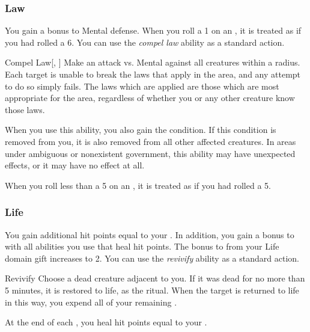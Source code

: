         \subsubsection{Law}
             You gain a  bonus to Mental defense.
             When you roll a 1 on an , it is treated as if you had rolled a 6.
             You can use the \textit{compel law} ability as a standard action.
            \begin{apability}{Compel Law}[, ]
                Make an attack vs. Mental against all creatures within a \arealarge radius.
                \hit Each target is unable to break the laws that apply in the area, and any attempt to do so simply fails.
                The laws which are applied are those which are most appropriate for the area, regardless of whether you or any other creature know those laws.

                When you use this ability, you also gain the condition.
                If this condition is removed from you, it is also removed from all other affected creatures.
                In areas under ambiguous or nonexistent government, this ability may have unexpected effects, or it may have no effect at all.
            \end{apability}
             When you roll less than a 5 on an , it is treated as if you had rolled a 5.

        \subsubsection{Life}
             You gain additional hit points equal to your .
                In addition, you gain a  bonus to  with all abilities you use that heal hit points.
             The bonus to  from your Life domain gift increases to 2.
             You can use the \textit{revivify} ability as a standard action.
            \begin{apability}{Revivify}
                Choose a dead creature adjacent to you.
                If it was dead for no more than 5 minutes, it is restored to life, as the  ritual.
                When the target is returned to life in this way, you expend all of your remaining .
            \end{apability}
             At the end of each , you heal hit points equal to your .


